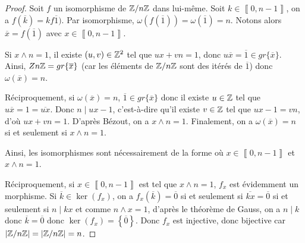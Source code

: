 \begin{proof}
	Soit $f$ un isomorphisme de $\mathbb{Z}/n\mathbb{Z}$ dans lui-même. Soit $k\in\left\llbracket 0, n-1\right\rrbracket$, on a $f(\overline{k})=kf\overline{1})$. Par isomorphisme, $\omega(f(\overline{1}))=\omega(\overline{1})=n$. Notons alors $\overline{x}=f(\overline{1})$ avec $x\in\left\llbracket 0,n-1\right\rrbracket$.

	Si $x\wedge n=1$, il existe $(u,v)\in\mathbb{Z}^{2}$ tel que $ux+vn=1$, donc $u\overline{x}=\overline{1}\in gr\{\overline{x}\}$. Ainsi, $Z\/n\mathbb{Z}=gr\{\overline{x}\}$ (car les éléments de $\mathbb{Z}/n\mathbb{Z}$ sont des itérés de $\overline{1}$) donc $\omega(\overline{x})=n$.

	Réciproquement, si $\omega(\overline{x})=n$, $\overline{1}\in gr\{\overline{x}\}$ donc il existe $u\in\mathbb{Z}$ tel que $u\overline{x}=1=\overline{ux}$. Donc $n\mid ux-1$, c'est-à-dire qu'il existe $v\in\mathbb{Z}$ tel que $ux-1=vn$, d'où $ux+vn=1$. D'après Bézout, on a $x\wedge n=1$. Finalement, on a $\omega(\overline{x})=n$ si et seulement si $x\wedge n=1$.

	Ainsi, les isomorphismes sont nécessairement de la forme 
	où $x\in\left\llbracket 0,n-1\right\rrbracket$ et $x\wedge n=1$.

	Réciproquement, si $x\in\left\llbracket 0,n-1\right\rrbracket$ est tel que $x\wedge n=1$, $f_{x}$ est évidemment un morphisme. Si $\overline{k}\in\ker\left(f_{x}\right)$, on a $f_{x}\left(\overline{k}\right)=\overline{0}$ si et seulement si $\overline{kx}=\overline{0}$ si et seulement si $n\mid kx$ et comme $n\wedge x=1$, d'après le théorème de Gauss, on a $n\mid k$ donc $\overline{k}=\overline{0}$ donc $\ker\left(f_{x}\right)=\left\{\overline{0}\right\}$. Donc $f_{x}$ est injective, donc bijective car $\left\vert\mathbb{Z}/n\mathbb{Z}\right\vert=\left\vert\mathbb{Z}/n\mathbb{Z}\right\vert=n$.
\end{proof}

